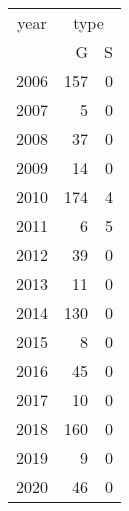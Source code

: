 \footnotesize\begin{tabular}[t]{lrr}
\toprule
\multicolumn{1}{c}{year} & \multicolumn{2}{c}{type} \\
\cmidrule(l{3pt}r{3pt}){1-1} \cmidrule(l{3pt}r{3pt}){2-3}
  & G & S\\
\midrule
2006 & 157 & 0\\
2007 & 5 & 0\\
2008 & 37 & 0\\
2009 & 14 & 0\\
2010 & 174 & 4\\
2011 & 6 & 5\\
2012 & 39 & 0\\
2013 & 11 & 0\\
2014 & 130 & 0\\
2015 & 8 & 0\\
2016 & 45 & 0\\
2017 & 10 & 0\\
2018 & 160 & 0\\
2019 & 9 & 0\\
2020 & 46 & 0\\
\bottomrule
\end{tabular}
